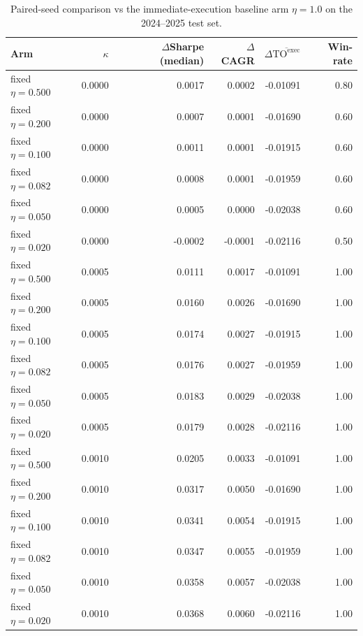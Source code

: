 \documentclass[10pt,twocolumn]{article}
\newcommand{\TOexec}{\mathrm{TO}^{\mathrm{exec}}}
\newcommand{\kappaTC}{\kappa}
\begin{document}
\begin{table}[t]
\centering
\scriptsize
\caption{Paired-seed comparison vs the immediate-execution baseline arm $\eta=1.0$ on the 2024--2025 test set.}
\label{tab:paired_delta}
\begin{tabular}{@{}lrrrrr@{}}
\toprule
Arm & $\kappaTC$ & $\Delta$Sharpe (median) & $\Delta$CAGR & $\Delta\overline{\TOexec}$ & Win-rate\\
\midrule
fixed $\eta=0.500$ & 0.0000 & 0.0017 & 0.0002 & -0.01091 & 0.80 \\
fixed $\eta=0.200$ & 0.0000 & 0.0007 & 0.0001 & -0.01690 & 0.60 \\
fixed $\eta=0.100$ & 0.0000 & 0.0011 & 0.0001 & -0.01915 & 0.60 \\
fixed $\eta=0.082$ & 0.0000 & 0.0008 & 0.0001 & -0.01959 & 0.60 \\
fixed $\eta=0.050$ & 0.0000 & 0.0005 & 0.0000 & -0.02038 & 0.60 \\
fixed $\eta=0.020$ & 0.0000 & -0.0002 & -0.0001 & -0.02116 & 0.50 \\
fixed $\eta=0.500$ & 0.0005 & 0.0111 & 0.0017 & -0.01091 & 1.00 \\
fixed $\eta=0.200$ & 0.0005 & 0.0160 & 0.0026 & -0.01690 & 1.00 \\
fixed $\eta=0.100$ & 0.0005 & 0.0174 & 0.0027 & -0.01915 & 1.00 \\
fixed $\eta=0.082$ & 0.0005 & 0.0176 & 0.0027 & -0.01959 & 1.00 \\
fixed $\eta=0.050$ & 0.0005 & 0.0183 & 0.0029 & -0.02038 & 1.00 \\
fixed $\eta=0.020$ & 0.0005 & 0.0179 & 0.0028 & -0.02116 & 1.00 \\
fixed $\eta=0.500$ & 0.0010 & 0.0205 & 0.0033 & -0.01091 & 1.00 \\
fixed $\eta=0.200$ & 0.0010 & 0.0317 & 0.0050 & -0.01690 & 1.00 \\
fixed $\eta=0.100$ & 0.0010 & 0.0341 & 0.0054 & -0.01915 & 1.00 \\
fixed $\eta=0.082$ & 0.0010 & 0.0347 & 0.0055 & -0.01959 & 1.00 \\
fixed $\eta=0.050$ & 0.0010 & 0.0358 & 0.0057 & -0.02038 & 1.00 \\
fixed $\eta=0.020$ & 0.0010 & 0.0368 & 0.0060 & -0.02116 & 1.00 \\
\bottomrule
\end{tabular}
\end{table}
\end{document}
